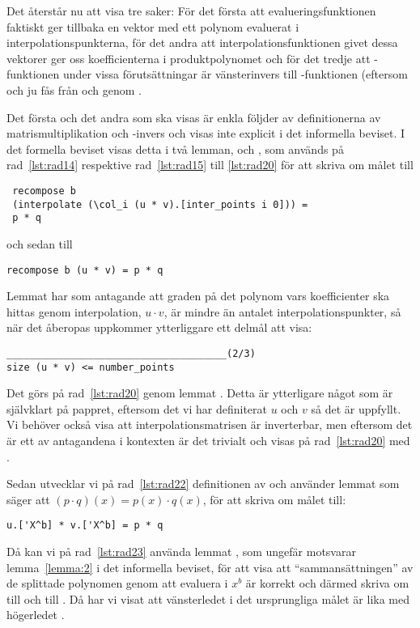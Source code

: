 Det återstår nu att visa tre saker: För det första att evalueringsfunktionen
 faktiskt ger tillbaka en vektor med ett polynom evaluerat i
interpolationspunkterna, för det andra att interpolationsfunktionen
 givet dessa vektorer ger oss koefficienterna i produktpolynomet
 och för det tredje att \C{recompose]}-funktionen under vissa
förutsättningar är vänsterinvers till -funktionen (eftersom  och
 ju fås från  och  genom .

Det första och det andra som ska visas är enkla följder av definitionerna av
matrismultiplikation och -invers och visas inte explicit i det informella
beviset. I det formella beviset visas detta i två lemman, 
och , som används på rad~\ref{lst:rad14} respektive
rad~\ref{lst:rad15} till \ref{lst:rad20} för att skriva om målet till
\begin{lstlisting}
 recompose b
 (interpolate (\col_i (u * v).[inter_points i 0])) =
 p * q
\end{lstlisting}
och sedan till
\begin{lstlisting}
recompose b (u * v) = p * q
\end{lstlisting}
Lemmat  har som antagande att graden på det polynom vars
koefficienter ska hittas genom interpolation, $u \cdot v$, är mindre än antalet
interpolationspunkter, så när det åberopas uppkommer ytterliggare ett delmål
att visa:
\begin{lstlisting}
______________________________________(2/3)
size (u * v) <= number_points
\end{lstlisting}
Det görs på rad~\ref{lst:rad20} genom lemmat . Detta är ytterligare
något som är självklart på pappret, eftersom det vi har definiterat $u$ och $v$
så det är uppfyllt. Vi behöver också visa att interpolationsmatrisen  är
inverterbar, men eftersom det är ett av antagandena i kontexten är det trivialt
och visas på rad~\ref{lst:rad20} med \C{//}.

Sedan utvecklar vi på rad~\ref{lst:rad22} definitionen av  och använder
lemmat  som säger att $(p \cdot q)(x) = p(x) \cdot q(x)$, för att
skriva om målet till:
\begin{lstlisting}
u.['X^b] * v.['X^b] = p * q
\end{lstlisting}
Då kan vi på rad~\ref{lst:rad23} använda lemmat , som ungefär
motsvarar lemma~\ref{lemma:2} i det informella beviset, för att visa att
``sammansättningen'' av de splittade polynomen genom att evaluera i $x^b$ är
korrekt och därmed skriva om  till  och  till
. Då har vi visat att vänsterledet i det ursprungliga målet är lika med
högerledet .


